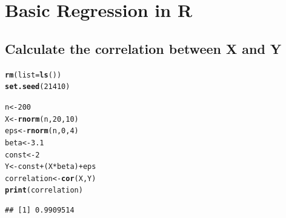 \documentclass{article}\usepackage[]{graphicx}\usepackage[]{color}
\makeatletter
\newcommand{\hlnum}[1]{\textcolor[rgb]{0.686,0.059,0.569}{#1}}%
\newcommand{\hlopt}[1]{\textcolor[rgb]{0,0,0}{#1}}%
\newcommand{\hlstd}[1]{\textcolor[rgb]{0.345,0.345,0.345}{#1}}%
\newcommand{\hlkwb}[1]{\textcolor[rgb]{0.69,0.353,0.396}{#1}}%
\newcommand{\hlkwc}[1]{\textcolor[rgb]{0.333,0.667,0.333}{#1}}%
\newcommand{\hlkwd}[1]{\textcolor[rgb]{0.737,0.353,0.396}{\textbf{#1}}}%
\newenvironment{kframe}{%
 \def\at@end@of@kframe{}%
 \ifinner\ifhmode%
  \def\at@end@of@kframe{\end{minipage}}%
  \begin{minipage}{\columnwidth}%
 \fi\fi%
 \def\FrameCommand##1{\hskip\@totalleftmargin \hskip-\fboxsep
 \colorbox{shadecolor}{##1}\hskip-\fboxsep
     \hskip-\linewidth \hskip-\@totalleftmargin \hskip\columnwidth}%
 \MakeFramed {\advance\hsize-\width
   \@totalleftmargin\z@ \linewidth\hsize
   \@setminipage}}%
 {\par\unskip\endMakeFramed%
 \at@end@of@kframe}
\newenvironment{knitrout}{}{} %
\makeatother
\begin{document}
\section{Basic Regression in R}
\subsection{Calculate the correlation between X and Y}
\begin{knitrout}
\color{fgcolor}\begin{kframe}
\begin{alltt}
\hlkwd{rm}\hlstd{(}\hlkwc{list}\hlstd{=}\hlkwd{ls}\hlstd{())}
\hlkwd{set.seed}\hlstd{(}\hlnum{21410}\hlstd{)}

\hlstd{n} \hlkwb{<-} \hlnum{200}
\hlstd{X} \hlkwb{<-} \hlkwd{rnorm}\hlstd{(n,}\hlnum{20}\hlstd{,}\hlnum{10}\hlstd{)}
\hlstd{eps} \hlkwb{<-} \hlkwd{rnorm}\hlstd{(n,}\hlnum{0}\hlstd{,}\hlnum{4}\hlstd{)}
\hlstd{beta} \hlkwb{<-} \hlnum{3.1}
\hlstd{const} \hlkwb{<-} \hlnum{2}
\hlstd{Y} \hlkwb{<-} \hlstd{const} \hlopt{+} \hlstd{(X} \hlopt{*} \hlstd{beta)} \hlopt{+} \hlstd{eps}
\hlstd{correlation} \hlkwb{<-} \hlkwd{cor}\hlstd{(X,Y)}
\hlkwd{print}\hlstd{(correlation)}
\end{alltt}
\begin{verbatim}
## [1] 0.9909514
\end{verbatim}
\end{kframe}
\end{knitrout}
\end{document}
